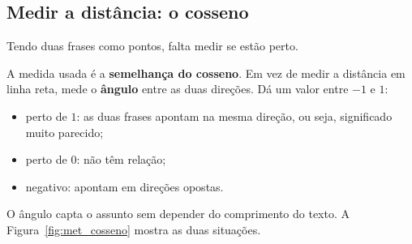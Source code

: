 \subsection{Medir a distância: o cosseno}
\label{sec:met_cosseno}

Tendo duas frases como pontos, falta medir se estão perto.

A medida usada é a \textbf{semelhança do cosseno}. Em vez de medir a distância em linha reta, mede o
\textbf{ângulo} entre as duas direções. Dá um valor entre $-1$ e $1$:

\begin{itemize}
  \item perto de $1$: as duas frases apontam na mesma direção, ou seja, significado muito parecido;
  \item perto de $0$: não têm relação;
  \item negativo: apontam em direções opostas.
\end{itemize}

O ângulo capta o assunto sem depender do comprimento do texto. A
Figura~\ref{fig:met_cosseno} mostra as duas situações.

